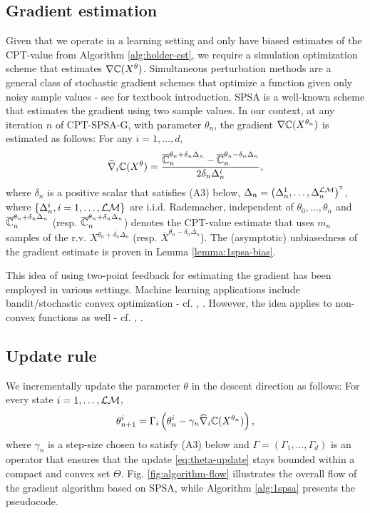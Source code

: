 \documentclass[11pt,letterpaper,english]{article}
\begin{document}
\subsection{Gradient estimation} 
Given that we operate in a learning setting and only have biased estimates of the CPT-value from Algorithm \ref{alg:holder-est}, we require a simulation optimization scheme that estimates $\nabla \mathbb{C}(X^\theta)$.  
Simultaneous perturbation methods are a general class of stochastic gradient schemes that optimize a function given only noisy sample values - see \cite{Bhatnagar13SR} for textbook introduction. SPSA is a well-known scheme that estimates the gradient using two sample values. In our context, at any iteration $n$ of CPT-SPSA-G, with parameter $\theta_n$, the gradient $\nabla \mathbb{C}(X^{\theta_n})$ is estimated as follows: For any  $i=1,\ldots,d$,
$$\widehat \nabla_{i} \mathbb{C}(X^\theta) = \dfrac{\overline {\mathbb{C}}_n^{\theta_n+\delta_n \Delta_n} - \overline {\mathbb{C}}_n^{\theta_n-\delta_n \Delta_n}}{2 \delta_n \Delta_n^{i}},$$
where $\delta_n$ is a positive scalar that satisfies (A3) below, $\Delta_n = \left( \Delta_n^{1},\ldots,\Delta_n^{\mathcal{L}\mathcal{M}}\right)^\mathsf{\scriptscriptstyle T}$, where $\{\Delta_n^{i}, i=1,\ldots,\mathcal{L}\mathcal{M}\}$ are i.i.d. Rademacher, independent of $\theta_0,\ldots,\theta_n$ and $\overline {\mathbb{C}}_n^{\theta_n+\delta_n \Delta_n}$ (resp. $\overline {\mathbb{C}}_n^{\theta_n+\delta_n \Delta_n}$) denotes the CPT-value estimate that uses $m_n$ samples of the r.v. $X^{\theta_n+\delta_n \Delta_n}$ (resp. $\overline X^{\theta_n-\delta_n \Delta_n}$).
The (asymptotic) unbiasedness of the gradient estimate is proven in Lemma \ref{lemma:1spsa-bias}.

This idea of using two-point feedback for estimating the gradient has been employed in various settings. Machine learning applications include bandit/stochastic convex optimization - cf. 
\cite{hazan2015online}, \cite{duchi2013optimal}. However, the idea applies to non-convex functions as well - cf. \cite{spall2005introduction}, \cite{Bhatnagar13SR}.


\subsection{Update rule} We incrementally update the parameter $\theta$ in the descent direction as follows: For every state $i=1,\ldots,\mathcal{L}\mathcal{M}$,
\begin{align}
\theta^{i}_{n+1} = \Gamma_{i}\left(\theta^{i}_n - \gamma_n  \widehat \nabla_{i} \mathbb{C}(X^{\theta_n})\right),
\label{eq:theta-update}
\end{align}
where  $\gamma_n$ is a step-size chosen to satisfy (A3) below and
$\Gamma=\left(\Gamma_{1},\ldots,\Gamma_{d}\right)$ is an operator that ensures that the update \eqref{eq:theta-update} stays bounded within a compact and convex set $\Theta$. 
Fig. \ref{fig:algorithm-flow} illustrates the overall flow of the gradient algorithm based on SPSA, while Algorithm \ref{alg:1spsa}  presents the pseudocode.  
\end{document}
